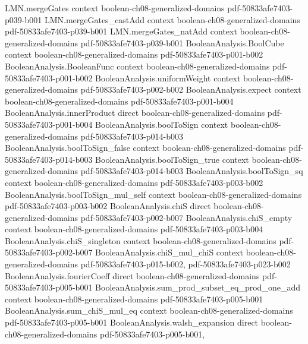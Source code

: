 \begin{theorem}
\proofstep
  {LMN.mergeGates}
  {context}
  {boolean-ch08-generalized-domains}
  {pdf-50833afe7403-p039-b001}
\proofstep
  {LMN.mergeGates_castAdd}
  {context}
  {boolean-ch08-generalized-domains}
  {pdf-50833afe7403-p039-b001}
\proofstep
  {LMN.mergeGates_natAdd}
  {context}
  {boolean-ch08-generalized-domains}
  {pdf-50833afe7403-p039-b001}
\proofstep
  {BooleanAnalysis.BoolCube}
  {context}
  {boolean-ch08-generalized-domains}
  {pdf-50833afe7403-p001-b002}
\proofstep
  {BooleanAnalysis.BooleanFunc}
  {context}
  {boolean-ch08-generalized-domains}
  {pdf-50833afe7403-p001-b002}
\proofstep
  {BooleanAnalysis.uniformWeight}
  {context}
  {boolean-ch08-generalized-domains}
  {pdf-50833afe7403-p002-b002}
\proofstep
  {BooleanAnalysis.expect}
  {context}
  {boolean-ch08-generalized-domains}
  {pdf-50833afe7403-p001-b004}
\proofstep
  {BooleanAnalysis.innerProduct}
  {direct}
  {boolean-ch08-generalized-domains}
  {pdf-50833afe7403-p001-b004}
\proofstep
  {BooleanAnalysis.boolToSign}
  {context}
  {boolean-ch08-generalized-domains}
  {pdf-50833afe7403-p014-b003}
\proofstep
  {BooleanAnalysis.boolToSign_false}
  {context}
  {boolean-ch08-generalized-domains}
  {pdf-50833afe7403-p014-b003}
\proofstep
  {BooleanAnalysis.boolToSign_true}
  {context}
  {boolean-ch08-generalized-domains}
  {pdf-50833afe7403-p014-b003}
\proofstep
  {BooleanAnalysis.boolToSign_sq}
  {context}
  {boolean-ch08-generalized-domains}
  {pdf-50833afe7403-p003-b002}
\proofstep
  {BooleanAnalysis.boolToSign_mul_self}
  {context}
  {boolean-ch08-generalized-domains}
  {pdf-50833afe7403-p003-b002}
\proofstep
  {BooleanAnalysis.chiS}
  {direct}
  {boolean-ch08-generalized-domains}
  {pdf-50833afe7403-p002-b007}
\proofstep
  {BooleanAnalysis.chiS_empty}
  {context}
  {boolean-ch08-generalized-domains}
  {pdf-50833afe7403-p003-b004}
\proofstep
  {BooleanAnalysis.chiS_singleton}
  {context}
  {boolean-ch08-generalized-domains}
  {pdf-50833afe7403-p002-b007}
\proofstep
  {BooleanAnalysis.chiS_mul_chiS}
  {context}
  {boolean-ch08-generalized-domains}
  {pdf-50833afe7403-p015-b002,
    pdf-50833afe7403-p023-b002}
\proofstep
  {BooleanAnalysis.fourierCoeff}
  {direct}
  {boolean-ch08-generalized-domains}
  {pdf-50833afe7403-p005-b001}
\proofstep
  {BooleanAnalysis.sum_prod_subset_eq_prod_one_add}
  {context}
  {boolean-ch08-generalized-domains}
  {pdf-50833afe7403-p005-b001}
\proofstep
  {BooleanAnalysis.sum_chiS_mul_eq}
  {context}
  {boolean-ch08-generalized-domains}
  {pdf-50833afe7403-p005-b001}
\proofstep
  {BooleanAnalysis.walsh_expansion}
  {direct}
  {boolean-ch08-generalized-domains}
  {pdf-50833afe7403-p005-b001,
}
\end{theorem}
